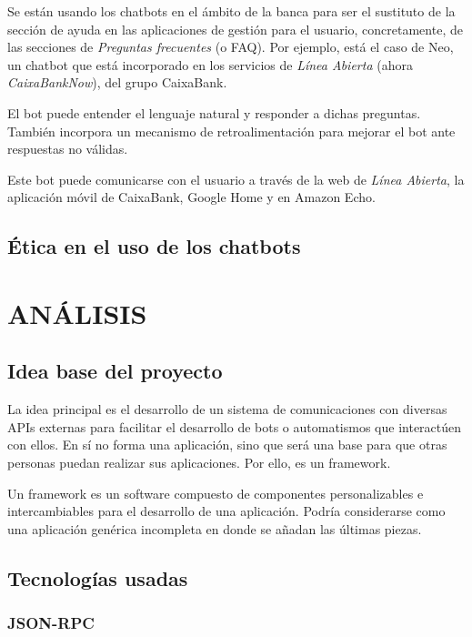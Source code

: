 \documentclass[spanish,12pt, a4paper, twoside]{paper}
\let\oldsection\section
\def\section{\cleardoublepage\oldsection}
\begin{document}
Se están usando los chatbots en el ámbito de la banca para ser el sustituto de la sección de ayuda en las aplicaciones de gestión para el usuario, concretamente, de las secciones de \emph{Preguntas frecuentes} (o FAQ). Por ejemplo, está el caso de Neo, un chatbot que está incorporado en los servicios de \emph{Línea Abierta} (ahora \emph{CaixaBankNow}), del grupo CaixaBank.
\newline

El bot puede entender el lenguaje natural y responder a dichas preguntas. También incorpora un mecanismo de retroalimentación para mejorar el bot ante respuestas no válidas.

Este bot puede comunicarse con el usuario a través de la web de \emph{Línea Abierta}, la aplicación móvil de CaixaBank, Google Home y en Amazon Echo.

\subsection{Ética en el uso de los chatbots}

\section{ANÁLISIS}

\subsection{Idea base del proyecto}

La idea principal es el desarrollo de un sistema de comunicaciones con diversas APIs externas para facilitar el desarrollo de bots o automatismos que interactúen con ellos. En sí no forma una aplicación, sino que será una base para que otras personas puedan realizar sus aplicaciones. Por ello, es un framework.
\newline

Un framework es un software compuesto de componentes personalizables e intercambiables para el desarrollo de una aplicación. Podría considerarse como una aplicación genérica incompleta en donde se añadan las últimas piezas. \cite[pág. 1]{FrameworkJJG}

\subsection{Tecnologías usadas}

\subsubsection{JSON-RPC}
\end{document}
